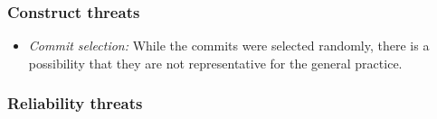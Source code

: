 \documentclass{beamer}
\begin{document}
\begin{frame}
\frametitle{Construct threats}
\begin{itemize}
	\item{\emph{Commit selection:}} While the commits were selected randomly, there is a possibility that they are not representative for the general practice. 
\end{itemize}
\end{frame}

\begin{frame}
\frametitle{Reliability threats}
\end{frame}
\end{document}
